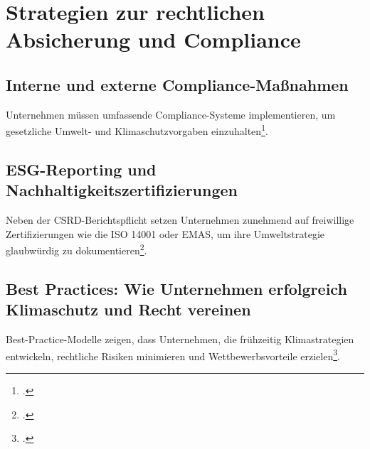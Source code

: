 \section{Strategien zur rechtlichen Absicherung und Compliance}

\subsection{Interne und externe Compliance-Maßnahmen}

Unternehmen müssen umfassende Compliance-Systeme implementieren, um gesetzliche Umwelt- und Klimaschutzvorgaben einzuhalten\footcite[]{bafin_nachhaltigkeit}.

\subsection{ESG-Reporting und Nachhaltigkeitszertifizierungen}

Neben der CSRD-Berichtspflicht setzen Unternehmen zunehmend auf freiwillige Zertifizierungen wie die ISO 14001 oder EMAS, um ihre Umweltstrategie glaubwürdig zu dokumentieren\footcite[]{eu_csrd}.

\subsection{Best Practices: Wie Unternehmen erfolgreich Klimaschutz und Recht vereinen}

Best-Practice-Modelle zeigen, dass Unternehmen, die frühzeitig Klimastrategien entwickeln, rechtliche Risiken minimieren und Wettbewerbsvorteile erzielen\footcite[]{fraunhofer_klimamanagement}.
%